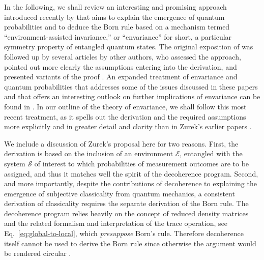 \documentclass[twocolumn,rmp,aps,amsmath,amsfonts,noshowkeys,noshowpacs]{revtex4}
\newcommand{\cf}{cf.\ }
\begin{document}
In the following, we shall review an interesting and promising
approach introduced recently by
\citet{Zurek:2002:ii,Zurek:2003:rv,Zurek:2003:pl,Zurek:2004:yb} that
aims to explain the emergence of quantum probabilities and to deduce
the Born rule based on a mechanism termed ``environment-assisted
invariance,'' or ``envariance'' for short, a particular symmetry
property of entangled quantum states. The original exposition of
\citet{Zurek:2002:ii} was followed up by several articles by other
authors, who assessed the approach, pointed out more clearly the
assumptions entering into the derivation, and presented variants of
the proof \cite{Schlosshauer:2003:ms,Barnum:2003:yb,Mohrhoff:2004:tv}.
An expanded treatment of envariance and quantum probabilities that
addresses some of the issues discussed in these papers and that offers
an interesting outlook on further implications of envariance can be
found in \citet{Zurek:2004:yb}. In our outline of the theory of
envariance, we shall follow this most recent treatment, as it spells
out the derivation and the required assumptions more explicitly and
in greater detail and clarity than in Zurek's earlier
\citeyearpar{Zurek:2002:ii,Zurek:2003:rv,Zurek:2003:pl} papers
\citep[\cf also the remarks of][]{Schlosshauer:2003:ms}.

We include a discussion of Zurek's proposal here for two reasons.
First, the derivation is based on the inclusion of an environment
$\mathcal{E}$, entangled with the system $\mathcal{S}$ of interest to
which probabilities of measurement outcomes are to be assigned, and
thus it matches well the spirit of the decoherence program. Second,
and more importantly, despite the contributions of decoherence to
explaining the emergence of subjective classicality from quantum
mechanics, a consistent derivation of classicality \citep[including a
motivation for some of the axioms of quantum mechanics, as suggested
by][]{Zurek:2002:ii} requires the separate derivation of the Born
rule.  The decoherence program relies heavily on the concept of
reduced density matrices and the related formalism and interpretation
of the trace operation, see Eq.~\eqref{eq:global-to-local}, which
\emph{presuppose} Born's rule.  Therefore decoherence itself cannot be
used to derive the Born rule \citetext{as was tried, for example, by
  \citealp{Deutsch:1999:tz} and \citealp{Zurek:1998:re}} since otherwise
the argument would be rendered circular
\citep{Zeh:1996:gy,Zurek:2002:ii}.
 
\end{document}
